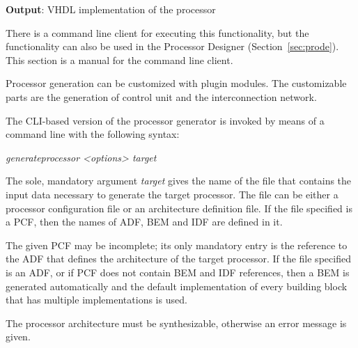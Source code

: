 \documentclass[twoside]{tceusermanual}
\begin{document}
\textbf{Output}: VHDL implementation of the processor

There is a command line client for executing this functionality, but the
functionality can also be used in the Processor Designer
(Section~\ref{sec:prode}). This section is a manual for the command line
client.

Processor generation can be customized with plugin modules. The customizable
parts are the generation of control unit and the interconnection network.

The CLI-based version of the processor generator is invoked by means of a
command line with the following syntax:

  \textit{generateprocessor <options> target}

The sole, mandatory argument \emph{target} gives the name of the file that
contains the input data necessary to generate the target processor. The file
can be either a processor configuration file or an architecture definition
file. If the file specified is a PCF, then the names of ADF, BEM and IDF are
defined in it.

The given PCF may be incomplete; its only mandatory entry is the reference
to the ADF that defines the architecture of the target processor.  If the
file specified is an ADF, or if PCF does not contain BEM and IDF references,
then a BEM is generated automatically and the default implementation of every
building block that has multiple implementations is used.

The processor architecture must be synthesizable, otherwise an error message
is given. \\
\end{document}
